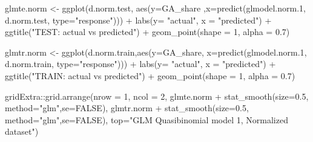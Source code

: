 \documentclass[
]{article}
\newenvironment{Shaded}{\begin{snugshade}}{\end{snugshade}}
\newcommand{\AttributeTok}[1]{\textcolor[rgb]{0.77,0.63,0.00}{#1}}
\newcommand{\ConstantTok}[1]{\textcolor[rgb]{0.00,0.00,0.00}{#1}}
\newcommand{\DecValTok}[1]{\textcolor[rgb]{0.00,0.00,0.81}{#1}}
\newcommand{\FloatTok}[1]{\textcolor[rgb]{0.00,0.00,0.81}{#1}}
\newcommand{\FunctionTok}[1]{\textcolor[rgb]{0.00,0.00,0.00}{#1}}
\newcommand{\NormalTok}[1]{#1}
\newcommand{\OtherTok}[1]{\textcolor[rgb]{0.56,0.35,0.01}{#1}}
\newcommand{\SpecialCharTok}[1]{\textcolor[rgb]{0.00,0.00,0.00}{#1}}
\newcommand{\StringTok}[1]{\textcolor[rgb]{0.31,0.60,0.02}{#1}}
\begin{document}
\begin{Shaded}
\begin{Highlighting}[]
\NormalTok{glmte.norm }\OtherTok{\textless{}{-}} \FunctionTok{ggplot}\NormalTok{(d.norm.test, }\FunctionTok{aes}\NormalTok{(}\AttributeTok{y=}\NormalTok{GA\_share ,}\AttributeTok{x=}\FunctionTok{predict}\NormalTok{(glmodel.norm}\FloatTok{.1}\NormalTok{, d.norm.test, }\AttributeTok{type=}\StringTok{"response"}\NormalTok{))) }\SpecialCharTok{+}
  \FunctionTok{labs}\NormalTok{(}\AttributeTok{y=} \StringTok{"actual"}\NormalTok{, }\AttributeTok{x =} \StringTok{"predicted"}\NormalTok{) }\SpecialCharTok{+} \FunctionTok{ggtitle}\NormalTok{(}\StringTok{"TEST: actual vs predicted"}\NormalTok{) }\SpecialCharTok{+} 
  \FunctionTok{geom\_point}\NormalTok{(}\AttributeTok{shape =} \DecValTok{1}\NormalTok{, }\AttributeTok{alpha =} \FloatTok{0.7}\NormalTok{)}

\NormalTok{glmtr.norm }\OtherTok{\textless{}{-}} \FunctionTok{ggplot}\NormalTok{(d.norm.train,}\FunctionTok{aes}\NormalTok{(}\AttributeTok{y=}\NormalTok{GA\_share, }\AttributeTok{x=}\FunctionTok{predict}\NormalTok{(glmodel.norm}\FloatTok{.1}\NormalTok{, d.norm.train, }\AttributeTok{type=}\StringTok{"response"}\NormalTok{))) }\SpecialCharTok{+}
  \FunctionTok{labs}\NormalTok{(}\AttributeTok{y=} \StringTok{"actual"}\NormalTok{, }\AttributeTok{x =} \StringTok{"predicted"}\NormalTok{) }\SpecialCharTok{+} \FunctionTok{ggtitle}\NormalTok{(}\StringTok{"TRAIN: actual vs predicted"}\NormalTok{) }\SpecialCharTok{+} 
  \FunctionTok{geom\_point}\NormalTok{(}\AttributeTok{shape =} \DecValTok{1}\NormalTok{, }\AttributeTok{alpha =} \FloatTok{0.7}\NormalTok{)}

\NormalTok{gridExtra}\SpecialCharTok{::}\FunctionTok{grid.arrange}\NormalTok{(}\AttributeTok{nrow =} \DecValTok{1}\NormalTok{, }\AttributeTok{ncol =} \DecValTok{2}\NormalTok{, }
\NormalTok{                        glmte.norm }\SpecialCharTok{+} \FunctionTok{stat\_smooth}\NormalTok{(}\AttributeTok{size=}\FloatTok{0.5}\NormalTok{, }\AttributeTok{method=}\StringTok{"glm"}\NormalTok{,}\AttributeTok{se=}\ConstantTok{FALSE}\NormalTok{),}
\NormalTok{                        glmtr.norm }\SpecialCharTok{+} \FunctionTok{stat\_smooth}\NormalTok{(}\AttributeTok{size=}\FloatTok{0.5}\NormalTok{, }\AttributeTok{method=}\StringTok{"glm"}\NormalTok{,}\AttributeTok{se=}\ConstantTok{FALSE}\NormalTok{),}
                        \AttributeTok{top=}\StringTok{"GLM Quasibinomial model 1, Normalized dataset"}\NormalTok{)}
\end{Highlighting}
\end{Shaded}
\end{document}
